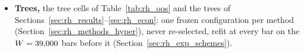 \begin{itemize}
\item \textbf{Trees,} the tree cells of Table~\ref{tab:rh_oos} and the trees of
  Sections~\ref{sec:rh_results}--\ref{sec:rh_econ}: one frozen configuration per method
  (Section~\ref{sec:rh_methods_hyper}), never re-selected, refit at every bar on the $W = 39{,}000$ bars
  before it (Section~\ref{sec:rh_exp_schemes}).

\end{itemize}
